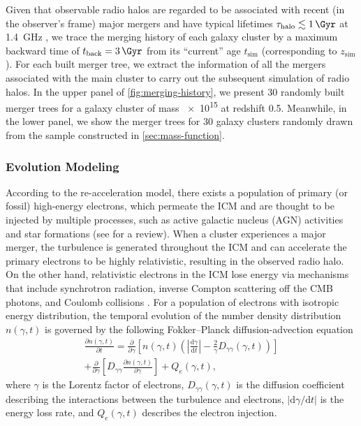\documentclass[twocolumn]{aastex62}
\newcommand{\R}[1]{\mathrm{#1}}
\newcommand{\D}[1]{\R{d} #1}
\newcommand{\diff}[2]{\frac{\D{#1}}{\D{#2}}}
\newcommand{\pdiff}[2]{\frac{\partial #1}{\partial #2}}
\newcommand{\editone}[1]{{\leavevmode\color{cyan}#1}}
\begin{document}
Given that observable radio halos are regarded to be associated
with recent (in the observer's frame) major mergers
and have typical lifetimes $\tau_{\R{halo}} \lesssim \SI{1}{\Gyr}$
at \SI{1.4}{\GHz} \citep[e.g.,][]{brunetti2009,cassano2016},
we trace the merging history of each galaxy cluster by a maximum
backward time of $t_{\R{back}} = \SI{3}{\Gyr}$ from its \enquote{current}
age $t_{\R{sim}}$ (corresponding to $z_{\R{sim}}$).
For each built merger tree, we extract the information of all
the mergers associated with the main cluster to carry out the
subsequent simulation of radio halos.
\editone{%
In the upper panel of \autoref{fig:merging-history}, we present 30 randomly
built merger trees for a galaxy cluster of mass \SI{e15}{\solarmass} at
redshift 0.5.
Meanwhile, in the lower panel, we show the merger trees for 30 galaxy
clusters randomly drawn from the sample constructed in
\autoref{sec:mass-function}.
}


\subsubsection{\editone{Evolution Modeling}}
\label{sec:halo-evo}

According to the re-acceleration model, there exists a population of
primary (or fossil) high-energy electrons, which permeate the ICM and
are thought to be injected by multiple processes, such as active
galactic nucleus (AGN) activities and star formations
(see \citealt{blasi2007rev} for a review).
When a cluster experiences a major merger, the turbulence is generated
throughout the ICM and can accelerate the primary electrons to be highly
relativistic, resulting in the observed radio halo.
On the other hand, relativistic electrons in the ICM lose energy via
mechanisms that include synchrotron radiation, inverse Compton scattering
off the CMB photons, and Coulomb collisions \citep{sarazin1999}.
For a population of electrons with isotropic energy distribution, the
temporal evolution of the number density distribution $n(\gamma, t)$
is governed by the following Fokker--Planck diffusion-advection equation
\citep{eilek1991,schlickeiser2002}
\begin{multline}
  \label{eq:fokkerplanck}
  \pdiff{n(\gamma,t)}{t} = \pdiff{}{\gamma} \left[ n(\gamma,t) \left(
      \left| \diff{\gamma}{t} \right| -
      \frac{2}{\gamma} D_{\gamma\gamma}(\gamma, t) \right) \right] \\
    + \pdiff{}{\gamma} \left[ D_{\gamma\gamma} \pdiff{n(\gamma,t)}{\gamma}
    \right] + Q_e(\gamma,t),
\end{multline}
where $\gamma$ is the Lorentz factor of electrons,
$D_{\gamma\gamma}(\gamma, t)$ is the diffusion coefficient describing
the interactions between the turbulence and electrons,
$|\R{d}\gamma / \R{d}t|$ is the energy loss rate,
and $Q_e(\gamma, t)$ describes the electron injection.
\end{document}
